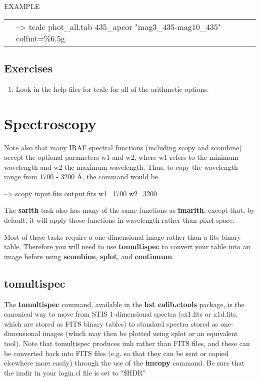 EXAMPLE

\begin{tabular}{ll}
& {\color{RoyalBlue} --> tcalc  phot\_all.tab     435\_apcor   "mag3\_435-mag10\_435"  colfmt=\%6.5g}
\end{tabular}

\subsection{Exercises}
\begin{enumerate}
\item Look in the help files for tcalc for all of the arithmetic options. 
\end{enumerate} 

\section{Spectroscopy}
Note also that many IRAF spectral functions (including scopy and scombine) accept the optional parameters w1 and w2, where w1 refers to the minimum wavelength and w2 the maximum wavelength. Thus, to copy the wavelength range from 1700 - 3200 \AA, the command would be 

{\color{RoyalBlue} --> scopy input.fits output.fits w1=1700 w2=3200}

The {\bf sarith} task also has many of the same functions as {\bf imarith}, except that, by default, it will apply those functions in wavelength rather than pixel space.

Most of these tasks require a one-dimensional image rather than a fits binary table. Therefore you will need to use {\bf tomultispec} to convert your table into an image before using {\bf scombine}, {\bf splot},  and {\bf continuum}.

\subsection{{\bf tomultispec}}
The {\bf tomultispec} command, available in the {\bf hst calib.ctools} package, is the canonical way to move from STIS 1-dimensional spectra (sx1.fits or x1d.fits, which are stored as FITS binary tables) to standard spectra stored as one-dimensional images (which may then be plotted using splot or an equivalent tool). Note that tomultispec produces imh rather than FITS files, and these can be converted back into FITS files (e.g. so that they can be sent or copied elsewhere more easily) through the use of the {\bf imcopy} command. Be sure that the imdir in your login.cl file is set to "\$HDR"

